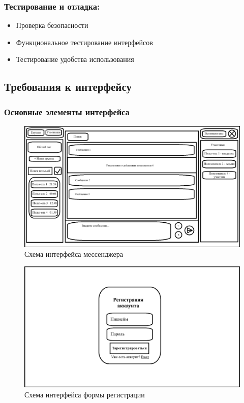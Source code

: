 \subsubsection {Тестирование и отладка:}
\begin{itemize}
    \item Проверка безопасности
	\item Функциональное тестирование интерфейсов
	\item Тестирование удобства использования
\end{itemize}
\newpage
\subsection{Требования к интерфейсу}

\subsubsection{Основные элементы интерфейса}

\begin{figure}[ht]
	\centering
	\includegraphics[width=0.8\linewidth]{"images/UI макет"}
	\caption{Схема интерфейса мессенджера}
	\label{fig:ui-main}
\end{figure}

\begin{figure}[ht]
	\centering
	\includegraphics[width=0.8\linewidth]{"images/UI макет регистрации"}
	\caption{Схема интерфейса формы регистрации}
	\label{fig:ui-reg}
\end{figure}

